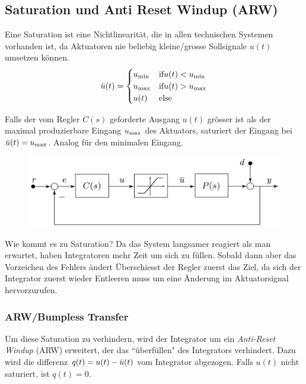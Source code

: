 \subsection{Saturation und Anti Reset Windup (ARW)}
    Eine Saturation ist eine Nichtlinearität, die in allen technischen Systemen vorhanden ist, da Aktuatoren nie beliebig kleine/grosse Sollsignale $u(t)$ umsetzen können.
    \begin{equation*}
        \Bar{u}(t) = 
        \begin{cases}
        u_\textnormal{min}   &\textnormal{if} u(t) < u_{\textnormal{min}}\\
        u_\textnormal{max}   &\textnormal{if} u(t) > u_{\textnormal{max}}\\
        u(t)    &\textnormal{else}
        \end{cases}
    \end{equation*}
    
    Falls der vom Regler $C(s)$ geforderte Ausgang $u(t)$ grösser ist als der maximal produzierbare Eingang $u_{\textnormal{max}}$ des Aktuators, saturiert der Eingang bei $\Bar{u}(t) = u_{\textnormal{max}}$. Analog für den minimalen Eingang.
    
    \begin{figure}[H]
        \centering
        \includegraphics[width = 0.6\linewidth]{images/04/arw.jpeg}
    \end{figure}
    
    Wie kommt es zu Saturation? Da das System langsamer reagiert als man erwartet, haben Integratoren mehr Zeit um sich zu füllen. Sobald dann aber das Vorzeichen des Fehlers ändert Überschiesst der Regler zuerst das Ziel, da sich der Integrator zuerst wieder Entleeren muss um eine Änderung im Aktuatorsignal hervorzurufen. 
    
    \subsubsection{ARW/Bumpless Transfer}
        Um diese Saturation zu verhindern, wird der Integrator um ein \textit{Anti-Reset Windup} (ARW) erweitert, der das ``überfüllen" des Integrators verhindert. Dazu wird die differenz $q(t) = u(t) - \Bar{u}(t)$ vom Integrator abgezogen. Falls $u(t)$ nicht saturiert, ist $q(t)= 0$.
        
